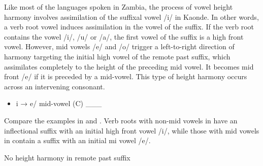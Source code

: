 \documentclass[output=paper]{langsci/langscibook}
\begin{document}
Like most of the languages spoken in Zambia, the process of vowel height harmony involves assimilation of the suffixal vowel /i/ in Kaonde. In other words, a verb root vowel induces assimilation in the vowel of the suffix. If the verb root contains the vowel /i/, /u/ or /a/, the first vowel of the suffix is a high front vowel. However, mid vowels /e/ and /o/ trigger a left-to-right direction of harmony targeting the initial high vowel of the remote past suffix, which assimilates completely to the height of the preceding mid vowel. It becomes mid front /e/ if it is preceded by a mid-vowel. This type of height harmony occurs across an intervening consonant.

\begin{itemize}
\item \begin{stylelsLanginfo}
i → e/ mid-vowel (C) \_\_\_
\end{stylelsLanginfo}\end{itemize}

Compare the examples in  and . Verb roots with non-mid vowels in  have an inflectional suffix with an initial high front vowel /i/, while those with mid vowels in  contain a suffix with an initial mi vowel /e/. 

\begin{table}
\caption{No height harmony in remote past suffix}
\label{tab:2}
\end{table}
\end{document}
